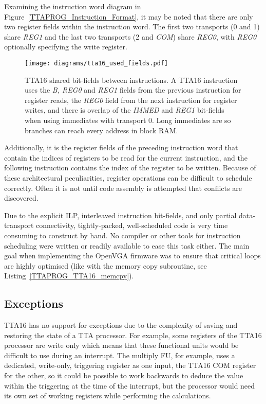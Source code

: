 Examining the instruction word diagram in
Figure~\ref{TTAPROG_Instruction_Format}, it may be noted that there are only two
register fields within the instruction word. The first two transports (0 and 1)
share \textit{REG1} and the last two transports (2 and \textit{COM}) share
\textit{REG0}, with \textit{REG0} optionally specifying the write register.

\begin{figure}[h!]
\begin{center}
\texttt{[image: diagrams/tta16\_used\_fields.pdf]}
\caption[TTA16 instruction shared bit-fields]{TTA16 shared bit-fields between
instructions. A TTA16 instruction uses the \textit{B, REG0} and \textit{REG1}
fields from the previous instruction for register reads, the \textit{REG0}
field from the next instruction for register writes, and there is overlap of
the \textit{IMMED} and \textit{REG1} bit-fields when using immediates with
transport 0. Long immediates are so branches can reach every address in block RAM.}
\label{TTAPROG_Used_Fields}
\end{center}
\end{figure}

Additionally, it is the register fields of the preceding instruction word
that contain the indices of registers to be read for the current instruction,
and the following instruction contains the index of the register to be written.
Because of these architectural peculiarities, register operations can be
difficult to schedule correctly. Often it is not until code assembly is
attempted that conflicts are discovered.

Due to the explicit ILP, interleaved instruction bit-fields, and only partial
data-transport connectivity, tightly-packed, well-scheduled code is very time
consuming to construct by hand. No compiler or other tools for instruction
scheduling were written or readily available to ease this task either. The
main goal when implementing the OpenVGA firmware was to ensure that critical
loops are highly optimised (like with the memory copy subroutine, see
Listing~\ref{TTAPROG_TTA16_memcpy}).


\subsection{Exceptions}
TTA16 has no support for exceptions due to the complexity of saving and
restoring the state of a TTA processor. For example, some registers of the TTA16
processor are write only which means that these functional units would be
difficult to use during an interrupt. The multiply FU, for example, uses a
dedicated, write-only, triggering register as one input, the TTA16 COM register
for the other, so it could be possible to work backwards to deduce the value
within the triggering at the time of the interrupt, but the processor would
need its own set of working registers while performing the calculations.

